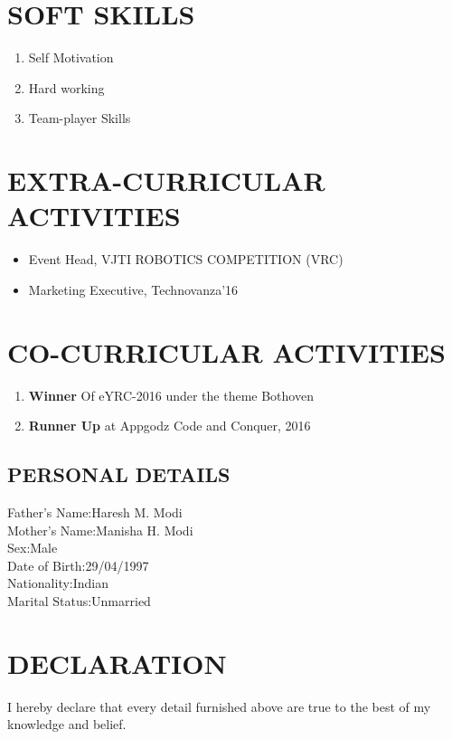 \documentclass[11pt,a4paper,sans]{moderncv}
\begin{document}
	\section{SOFT SKILLS}
	\begin{enumerate}
		\item {Self Motivation}
		\item {Hard working}
		\item {Team-player Skills}
		
	\end{enumerate}
	\section{EXTRA-CURRICULAR ACTIVITIES}
	\begin{itemize}
		\item {Event Head, VJTI ROBOTICS COMPETITION (VRC)}
		\item {Marketing Executive, Technovanza'16}
	\end{itemize}
	\section{CO-CURRICULAR ACTIVITIES}
	\begin{enumerate}
		\item{\textbf{Winner} Of eYRC-2016 under the theme Bothoven}
		\item{\textbf{Runner Up} at Appgodz Code and Conquer, 2016}
	\end{enumerate}
	\begin{flushleft}
		\section{PERSONAL DETAILS}
		Father's Name:\hspace{0.1in}Haresh M. Modi\\	
		Mother's Name:\hspace{0.06in}Manisha H. Modi\\
		Sex:\hspace{0.78in}Male\\
		Date of Birth:\hspace{0.16in}29/04/1997\\
		Nationality:\hspace{0.3in}Indian\\
		Marital Status:\hspace{0.1in}Unmarried\\
	\end{flushleft}
	\section{DECLARATION}
	I hereby declare that every detail furnished above are true to the best of my knowledge and belief.
\end{document}
